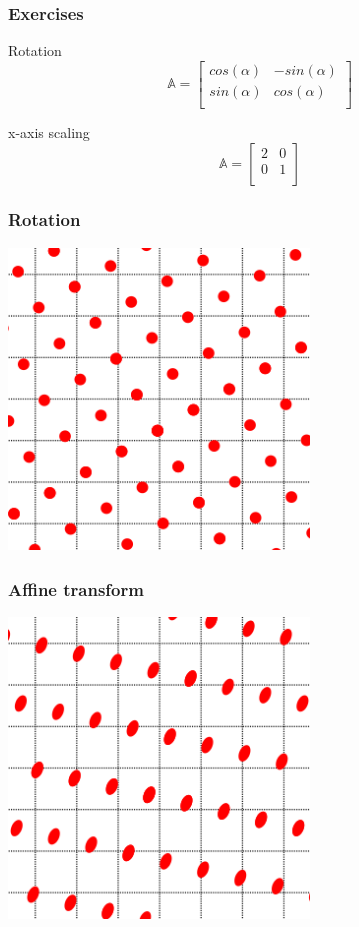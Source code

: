 \documentclass{beamer}
\begin{document}
\begin{frame}
\centering
\frametitle{Exercises}
\begin{block}{Rotation}
$$ \mathbb{A} = \begin{bmatrix}
    cos(\alpha)       & -sin(\alpha)  \\
    sin(\alpha)       & cos(\alpha)  \\   
\end{bmatrix}$$
\end{block}

\begin{block}{x-axis scaling}
$$ \mathbb{A} = \begin{bmatrix}
    2       & 0  \\
    0       & 1  \\   
\end{bmatrix}$$
\end{block}
\end{frame}

\begin{frame}
\centering
\frametitle{Rotation}
\includegraphics[width=0.6\textwidth]{rotate.png}
\end{frame}

\begin{frame}
\centering
\frametitle{Affine transform}
\includegraphics[width=0.6\textwidth]{afine.png}
\end{frame}
\end{document}
